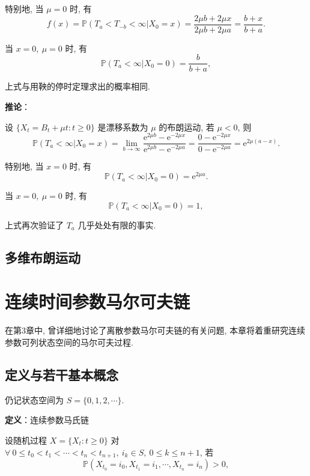 \documentclass[openany]{ctexbook}
\theoremstyle{kaiti}
\theoremstyle{normal}
\begin{document}
特别地, 当 $\mu=0$ 时, 有
\begin{equation}
  f(x)=\mathbb{P}(T_a<T_{-b}<\infty|X_0=x)=\frac{2\mu b+2\mu x}{2\mu b+2\mu a}=\frac{b+x}{b+a}.
\end{equation}

当 $x=0,~\mu=0$ 时, 有
\begin{equation}
  \mathbb{P}(T_a<\infty|X_0=0)=\frac{b}{b+a},
\end{equation}

上式与用鞅的停时定理求出的概率相同.

\textbf{推论}：

设 $\{X_t=B_t+\mu t:t\geqslant0\}$ 是漂移系数为 $\mu$ 的布朗运动, 若 $\mu<0$, 则
\begin{equation}
  \mathbb{P}(T_a<\infty|X_0=x)=\lim_{b\to\infty}\frac{\mathrm{e}^{2\mu b}-\mathrm{e}^{-2\mu x}}{\mathrm{e}^{2\mu b}-\mathrm{e}^{-2\mu a}}=\frac{0-\mathrm{e}^{-2\mu x}}{0-\mathrm{e}^{-2\mu a}}=\mathrm{e}^{2\mu (a-x)}.
\end{equation}

特别地, 当 $x=0$ 时, 有
\begin{equation}
  \mathbb{P}(T_a<\infty|X_0=0)=\mathrm{e}^{2\mu a}.
\end{equation}

当 $x=0,~\mu=0$ 时, 有
\begin{equation}
  \mathbb{P}(T_a<\infty|X_0=0)=1,
\end{equation}

上式再次验证了 $T_a$ 几乎处处有限的事实.

\section{多维布朗运动}

\chapter{连续时间参数马尔可夫链}

在第3章中, 曾详细地讨论了离散参数马尔可夫链的有关问题, 本章将着重研究连续参数可列状态空间的马尔可夫过程.

\section{定义与若干基本概念}

仍记状态空间为 $S=\{0,1,2,\cdots\}$.

\textbf{定义}：连续参数马氏链

设随机过程 $X=\{X_t:t\geqslant0\}$ 对 $\forall~0\leqslant t_0 < t_1 < \cdots < t_n < t_{n+1},~i_k\in S,~0\leqslant k\leqslant n+1$, 若
\begin{equation}
  \mathbb{P}(X_{t_0}=i_0,X_{t_1}=i_1,\cdots,X_{t_n}=i_n)>0,
\end{equation}
\end{document}
